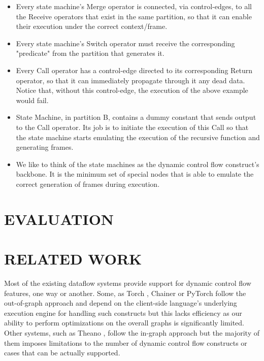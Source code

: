 \documentclass[ack,preface]{dithesis}
\begin{document}
\begin{itemize}
    \item Every state machine's Merge operator is connected, via control-edges, to all the Receive operators that exist in the same partition, so that it can enable their execution under the correct context/frame.
    \item Every state machine's Switch operator must receive the corresponding "predicate" from the partition that generates it.
    \item Every Call operator has a control-edge directed to its corresponding Return operator, so that it can immediately propagate through it any dead data. Notice that, without this control-edge, the execution of the above example would fail.
    \item State Machine, in partition B, contains a dummy constant that sends output to the Call operator. Its job is to initiate the execution of this Call so that the state machine starts emulating the execution of the recursive function and generating frames.
    \item We like to think of  the state machines as the dynamic control flow construct's backbone. It is the minimum set of special nodes that  is able to emulate the correct generation of frames during execution.
    \end{itemize}




\chapter{EVALUATION}


\chapter{RELATED WORK}

Most of the existing dataflow systems provide support for dynamic control flow features, one way or another. 
Some, as Torch \cite{Torch}, Chainer \cite{Chainer_learningsys2015} or PyTorch \cite{Paszke2017} follow the out-of-graph approach and depend on the client-side language's underlying execution engine for handling such constructs but this lacks efficiency as our ability to perform optimizations on the overall graphs is significantly limited. Other systems, such as Theano \cite{Theano1}, follow the in-graph approach but the majority of them imposes limitations to the number of dynamic control flow constructs or cases that can be actually supported. 
\end{document}
